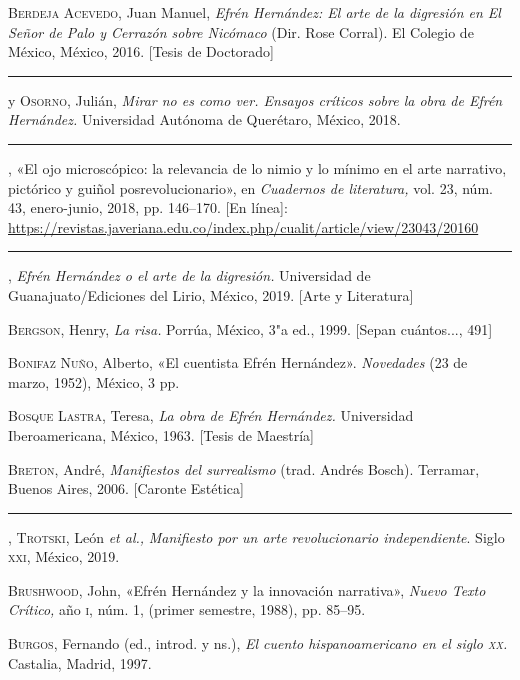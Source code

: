 \documentclass[14pt,twoside,final]{extbook} %
\begin{document}
\textsc{Berdeja Acevedo}, Juan Manuel, \emph{Efrén Hernández: El arte de la digresión en \emph{El Señor de Palo} y \emph{Cerrazón sobre Nicómaco}} (Dir. Rose Corral). El Colegio de México, México, 2016. [Tesis de Doctorado]\label{bib:berdeja2016}

\rule{1cm}{0.4pt} y \textsc{Osorno}, Julián, \emph{Mirar no es como ver. Ensayos críticos sobre la obra de Efrén Hernández.} Universidad Autónoma de Querétaro, México, 2018.\label{bib:berdeja2018a}

\rule{1cm}{0.4pt}, «El ojo microscópico: la relevancia de lo nimio y lo mínimo en el arte narrativo, pictórico y guiñol posrevolucionario», en \emph{Cuadernos de literatura,} vol. 23, núm. 43, enero-junio, 2018, pp. 146--170. [En línea]: \url{https://revistas.javeriana.edu.co/index.php/cualit/article/view/23043/20160}\label{bib:berdeja2018b}

\rule{1cm}{0.4pt}, \emph{Efrén Hernández o el arte de la digresión.} Universidad de Guanajuato/Ediciones del Lirio, México, 2019. [Arte y Literatura]\label{bib:berdeja2019} 

\textsc{Bergson}, Henry, \emph{La risa.} Porrúa, México, 3"a ed., 1999. [Sepan cuántos..., 491]\label{bib:bergson1999}

\textsc{Bonifaz Nuño}, Alberto, «El cuentista Efrén Hernández». \emph{Novedades} (23 de marzo, 1952), México, 3 pp.\label{bib:bonifaz1952}

\textsc{Bosque Lastra}, Teresa, \emph{La obra de Efrén Hernández.} Universidad Iberoamericana, México, 1963. [Tesis de Maestría]\label{bib:bosque1963}

\textsc{Breton}, André, \emph{Manifiestos del surrealismo} (trad. Andrés Bosch). Terramar, Buenos Aires, 2006. [Caronte Estética]\label{bib:breton2006}

\rule{1cm}{0.4pt}, \textsc{Trotski}, León \emph{et al.,} \emph{Manifiesto por un arte revolucionario independiente}. Siglo \textsc{xxi}, México, 2019.\label{bib:breton2019}

\textsc{Brushwood}, John, «Efrén Hernández y la innovación narrativa», \emph{Nuevo Texto Crítico,} año \textsc{i}, núm. 1, (primer semestre, 1988), pp. 85--95.\label{bib:}

\textsc{Burgos}, Fernando (ed., introd. y ns.), \emph{El cuento hispanoamericano en el siglo \textsc{xx}.} Castalia, Madrid, 1997.\label{bib:burgos1997}
\end{document}
